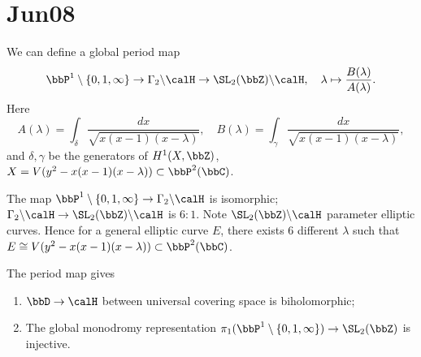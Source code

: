 \section{Jun08}

\begin{theorem}
  We can define a global period map
  \[ \bbP^1 \setminus \{0,1,\infty\} \to \Gamma_2 \backslash \calH \to \SL_2(\bbZ) \backslash \calH, \quad \lambda \mapsto \frac{B(\lambda)}{A(\lambda)}. \]
  Here 
  \[ A(\lambda) = \int_{\delta} \frac{d x}{\sqrt{x(x-1)(x-\lambda)}}, \quad B(\lambda) = \int_{\gamma} \frac{d x}{\sqrt{x(x-1)(x-\lambda)}}, \]
  and $\delta,\gamma$ be the generators of $H^1(X,\bbZ)$, $X = V(y^2-x(x-1)(x-\lambda)) \subset \bbP^2(\bbC)$.
\end{theorem}

\begin{remark}
  The map $\bbP^1 \setminus \{0,1,\infty\} \to \Gamma_2 \backslash \calH$ is isomorphic;
  $ \Gamma_2 \backslash \calH \to \SL_2(\bbZ) \backslash \calH$ is $6:1$.
  Note $\SL_2(\bbZ) \backslash \calH$ parameter elliptic curves.
  Hence for a general elliptic curve $E$, there exists $6$ different $\lambda$ such that $E \cong V(y^2-x(x-1)(x-\lambda)) \subset \bbP^2(\bbC)$.
\end{remark}

\begin{theorem}
  The period map gives
  \begin{enumerate}
    \item $\bbD \to \calH$ between universal covering space is biholomorphic;
    \item The global monodromy representation $\pi_1(\bbP^1 \setminus \{0,1,\infty\}) \to \SL_2(\bbZ)$ is injective.
  \end{enumerate}
\end{theorem}
